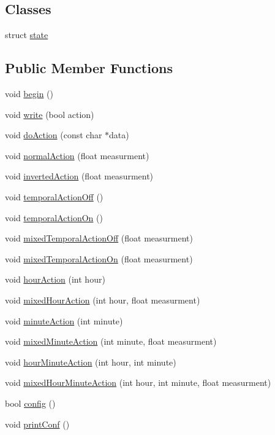 \subsection*{Classes}
\begin{DoxyCompactItemize}
\item 
struct \hyperlink{struct_cool_board_actor_1_1state}{state}
\end{DoxyCompactItemize}
\subsection*{Public Member Functions}
\begin{DoxyCompactItemize}
\item 
void \hyperlink{class_cool_board_actor_a7f4422fd85a5510bc2cdfd68e109be5e}{begin} ()
\item 
void \hyperlink{class_cool_board_actor_a958786ff01ea1056ee72c72d439f86da}{write} (bool action)
\item 
void \hyperlink{class_cool_board_actor_a96a45658d32c6b95caa2f385c7da32cd}{do\+Action} (const char $\ast$data)
\item 
void \hyperlink{class_cool_board_actor_a81229abf5895f4d3b0355050b822b438}{normal\+Action} (float measurment)
\item 
void \hyperlink{class_cool_board_actor_aae82b2e62f91be009d40f93c206f9bda}{inverted\+Action} (float measurment)
\item 
void \hyperlink{class_cool_board_actor_a02698bd647df49cabbe74513d4d88918}{temporal\+Action\+Off} ()
\item 
void \hyperlink{class_cool_board_actor_ada603785c203fdb0b41cc967d70bdc4d}{temporal\+Action\+On} ()
\item 
void \hyperlink{class_cool_board_actor_a00b29c4abf0388551aa6812372113cf1}{mixed\+Temporal\+Action\+Off} (float measurment)
\item 
void \hyperlink{class_cool_board_actor_a216aa7a0cfd1f31d0025cc91c2ecd5dd}{mixed\+Temporal\+Action\+On} (float measurment)
\item 
void \hyperlink{class_cool_board_actor_adf3b4e15b9d73681082112adf8ef95cb}{hour\+Action} (int hour)
\item 
void \hyperlink{class_cool_board_actor_a6d93a24502c56ced2ef7675c913a276b}{mixed\+Hour\+Action} (int hour, float measurment)
\item 
void \hyperlink{class_cool_board_actor_af000944ce0b9abb9c6ee4b8fe839fb36}{minute\+Action} (int minute)
\item 
void \hyperlink{class_cool_board_actor_a2b8a79a27288d5246e3e3860ae76770d}{mixed\+Minute\+Action} (int minute, float measurment)
\item 
void \hyperlink{class_cool_board_actor_a1eb1fbca19bc80aad20d2686d52317f8}{hour\+Minute\+Action} (int hour, int minute)
\item 
void \hyperlink{class_cool_board_actor_ae6b2a17b0e73cfeb353ded2cc4e08109}{mixed\+Hour\+Minute\+Action} (int hour, int minute, float measurment)
\item 
bool \hyperlink{class_cool_board_actor_a5af5538fc7d169f63127e06d5219bcd4}{config} ()
\item 
void \hyperlink{class_cool_board_actor_aabb10e7aebc3249ffc940530de29f84a}{print\+Conf} ()
\end{DoxyCompactItemize}
